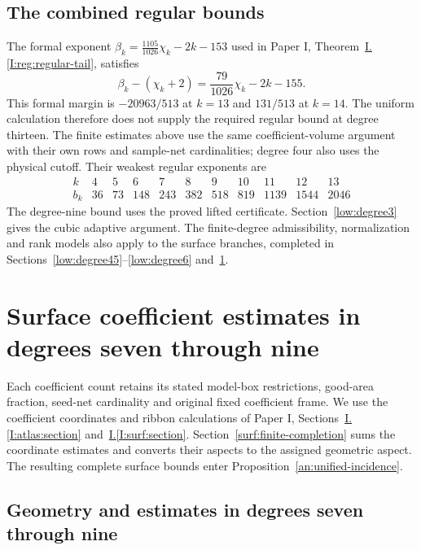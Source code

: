 \documentclass[11pt]{amsart}
\theoremstyle{definition}
\theoremstyle{remark}
\numberwithin{equation}{section}
\newcommand{\partIref}[1]{\hyperref[I:#1]{I.\ref*{I:#1}}}
\begin{document}
\subsection{The combined regular bounds}\label{reg:combined}\label{reg:finite-guide}

The formal exponent $\beta_k=\frac{1105}{1026}\chi_k-2k-153$ used in Paper I, Theorem~\partIref{reg:regular-tail}, satisfies
\[
 \beta_k-(\chi_k+2)=\frac{79}{1026}\chi_k-2k-155.
\]
This formal margin is $-20963/513$ at $k=13$ and $131/513$ at $k=14$. The uniform calculation therefore does not supply the required regular bound at degree thirteen. The finite estimates above use the same coefficient-volume argument with their own rows and sample-net cardinalities; degree four also uses the physical cutoff. Their weakest regular exponents are
\[
\begin{array}{c|rrrrrrrrrr}
k&4&5&6&7&8&9&10&11&12&13\\\hline
b_k&36&73&148&243&382&518&819&1139&1544&2046
\end{array}
\]
The degree-nine bound uses the proved lifted certificate. Section~\ref{low:degree3} gives the cubic adaptive argument. The finite-degree admissibility, normalization and rank models also apply to the surface branches, completed in Sections~\ref{low:degree45}--\ref{low:degree6} and~\ref{surf:finite-section}.


\section{Surface coefficient estimates in degrees seven through nine}\label{surf:finite-section}

Each coefficient count retains its stated model-box restrictions, good-area fraction, seed-net cardinality and original fixed coefficient frame. We use the coefficient coordinates and ribbon calculations of Paper I, Sections~\partIref{atlas:section} and~\partIref{surf:section}. Section~\ref{surf:finite-completion} sums the coordinate estimates and converts their aspects to the assigned geometric aspect. The resulting complete surface bounds enter Proposition~\ref{an:unified-incidence}.

\subsection{Geometry and estimates in degrees seven through nine}\label{surf:common-geometry}\label{low:78:s78pf:section}\label{low:78:s78cf:framework}\label{low:9:root9:interfaces}\label{low:degree78}\label{low:78:s37g:section}\label{low:78:s7c:section}\label{low:degree9}
\end{document}

